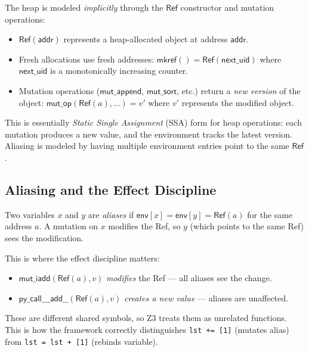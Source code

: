 \begin{definition}
The heap is modeled \emph{implicitly} through the $\mathsf{Ref}$
constructor and mutation operations:
\begin{itemize}
  \item $\mathsf{Ref}(\mathsf{addr})$ represents a heap-allocated
    object at address $\mathsf{addr}$.
  \item Fresh allocations use fresh addresses:
    $\mathsf{mkref}() = \mathsf{Ref}(\mathsf{next\_uid})$
    where $\mathsf{next\_uid}$ is a monotonically increasing counter.
  \item Mutation operations ($\mathsf{mut\_append}$,
    $\mathsf{mut\_sort}$, etc.) return a \emph{new version} of the
    object: $\mathsf{mut\_op}(\mathsf{Ref}(a), \ldots) = v'$
    where $v'$ represents the modified object.
\end{itemize}
\end{definition}

\begin{remark}
This is essentially \emph{Static Single Assignment} (SSA) form for
heap operations: each mutation produces a new value, and the
environment tracks the latest version.  Aliasing is modeled by
having multiple environment entries point to the same $\mathsf{Ref}$.
\end{remark}

\subsection{Aliasing and the Effect Discipline}

\begin{definition}
Two variables $x$ and $y$ are \emph{aliases} if
$\mathsf{env}[x] = \mathsf{env}[y] = \mathsf{Ref}(a)$ for the same
address $a$.  A mutation on $x$ modifies the Ref, so $y$ (which
points to the same Ref) sees the modification.
\end{definition}

This is where the effect discipline matters:
\begin{itemize}
  \item $\mathsf{mut\_iadd}(\mathsf{Ref}(a), v)$ \emph{modifies}
    the Ref --- all aliases see the change.
  \item $\mathsf{py\_call\_\_\_add\_\_}(\mathsf{Ref}(a), v)$
    \emph{creates a new value} --- aliases are unaffected.
\end{itemize}

These are different shared symbols, so Z3 treats them as unrelated
functions.  This is how the framework correctly distinguishes
\texttt{lst += [1]} (mutates alias) from \texttt{lst = lst + [1]}
(rebinds variable).


